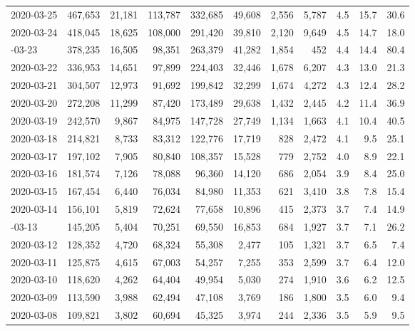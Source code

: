 \documentclass[12pt, a4paper,oneside]{book}
\theoremstyle{definition}
\begin{document}
\begin{longtable}{lrrrrrrrrrr}
	2020-03-25 & 467,653 & 21,181 & 113,787 & 332,685 & 49,608 & 2,556 & 5,787 & 4.5 & 15.7 & 30.6\\
	\rowcolor{gray!6}  2020-03-24 & 418,045 & 18,625 & 108,000 & 291,420 & 39,810 & 2,120 & 9,649 & 4.5 & 14.7 & 18.0\\
	\addlinespace
	2020-03-23 & 378,235 & 16,505 & 98,351 & 263,379 & 41,282 & 1,854 & 452 & 4.4 & 14.4 & 80.4\\
	\rowcolor{gray!6}  2020-03-22 & 336,953 & 14,651 & 97,899 & 224,403 & 32,446 & 1,678 & 6,207 & 4.3 & 13.0 & 21.3\\
	2020-03-21 & 304,507 & 12,973 & 91,692 & 199,842 & 32,299 & 1,674 & 4,272 & 4.3 & 12.4 & 28.2\\
	\rowcolor{gray!6}  2020-03-20 & 272,208 & 11,299 & 87,420 & 173,489 & 29,638 & 1,432 & 2,445 & 4.2 & 11.4 & 36.9\\
	2020-03-19 & 242,570 & 9,867 & 84,975 & 147,728 & 27,749 & 1,134 & 1,663 & 4.1 & 10.4 & 40.5\\
	\addlinespace
	\rowcolor{gray!6}  2020-03-18 & 214,821 & 8,733 & 83,312 & 122,776 & 17,719 & 828 & 2,472 & 4.1 & 9.5 & 25.1\\
	2020-03-17 & 197,102 & 7,905 & 80,840 & 108,357 & 15,528 & 779 & 2,752 & 4.0 & 8.9 & 22.1\\
	\rowcolor{gray!6}  2020-03-16 & 181,574 & 7,126 & 78,088 & 96,360 & 14,120 & 686 & 2,054 & 3.9 & 8.4 & 25.0\\
	2020-03-15 & 167,454 & 6,440 & 76,034 & 84,980 & 11,353 & 621 & 3,410 & 3.8 & 7.8 & 15.4\\
	\rowcolor{gray!6}  2020-03-14 & 156,101 & 5,819 & 72,624 & 77,658 & 10,896 & 415 & 2,373 & 3.7 & 7.4 & 14.9\\
	\addlinespace
	2020-03-13 & 145,205 & 5,404 & 70,251 & 69,550 & 16,853 & 684 & 1,927 & 3.7 & 7.1 & 26.2\\
	\rowcolor{gray!6}  2020-03-12 & 128,352 & 4,720 & 68,324 & 55,308 & 2,477 & 105 & 1,321 & 3.7 & 6.5 & 7.4\\
	2020-03-11 & 125,875 & 4,615 & 67,003 & 54,257 & 7,255 & 353 & 2,599 & 3.7 & 6.4 & 12.0\\
	\rowcolor{gray!6}  2020-03-10 & 118,620 & 4,262 & 64,404 & 49,954 & 5,030 & 274 & 1,910 & 3.6 & 6.2 & 12.5\\
	2020-03-09 & 113,590 & 3,988 & 62,494 & 47,108 & 3,769 & 186 & 1,800 & 3.5 & 6.0 & 9.4\\
	\addlinespace
	\rowcolor{gray!6}  2020-03-08 & 109,821 & 3,802 & 60,694 & 45,325 & 3,974 & 244 & 2,336 & 3.5 & 5.9 & 9.5\\

\end{longtable}
\end{document}
